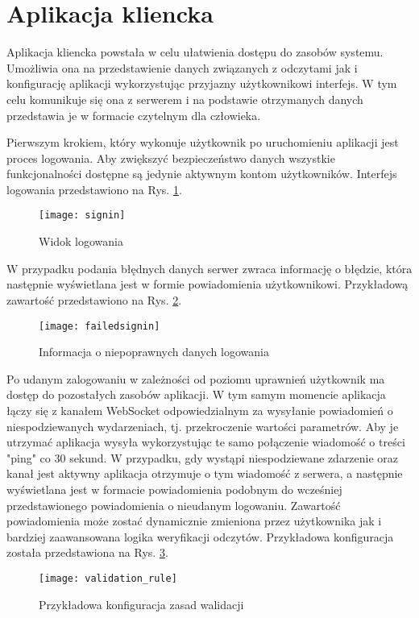 \section{Aplikacja kliencka}
Aplikacja kliencka powstała w celu ułatwienia dostępu do zasobów systemu.
Umożliwia ona na przedstawienie danych związanych z odczytami jak i konfigurację
aplikacji wykorzystując przyjazny użytkownikowi interfejs. W tym celu komunikuje
się ona z serwerem i na podstawie otrzymanych danych przedstawia je w formacie
czytelnym dla człowieka. 

Pierwszym krokiem, który wykonuje użytkownik po uruchomieniu aplikacji jest 
proces logowania. Aby zwiększyć bezpieczeństwo danych wszystkie funkcjonalności
dostępne są jedynie aktywnym kontom użytkowników.
Interfejs logowania przedstawiono na Rys. \ref{atmosphere:signin}.
\begin{figure}[h!]
  \centering
  \texttt{[image: signin]}
  \caption{Widok logowania}
  \label{atmosphere:signin}
\end{figure}
W przypadku podania błędnych danych serwer zwraca informację o błędzie, która następnie
wyświetlana jest w formie powiadomienia użytkownikowi. Przykładową zawartość przedstawiono
na Rys. \ref{atmosphere:failedsignin}.
\begin{figure}[h!]
  \centering
  \texttt{[image: failedsignin]}
  \caption{Informacja o niepoprawnych danych logowania}
  \label{atmosphere:failedsignin}
\end{figure}
Po udanym zalogowaniu w zależności od poziomu uprawnień użytkownik ma dostęp
do pozostałych zasobów aplikacji.
W tym samym momencie aplikacja łączy się z kanałem WebSocket odpowiedzialnym za
wysyłanie powiadomień o niespodziewanych wydarzeniach, tj. przekroczenie
wartości parametrów. Aby je utrzymać aplikacja wysyła wykorzystując te samo
połączenie wiadomość o treści "ping" co 30 sekund. W przypadku, gdy
wystąpi niespodziewane zdarzenie oraz kanał jest aktywny aplikacja otrzymuje
o tym wiadomość z serwera, a następnie wyświetlana jest w formacie powiadomienia
podobnym do wcześniej przedstawionego powiadomienia o nieudanym logowaniu.
Zawartość powiadomienia może zostać dynamicznie zmieniona przez użytkownika
jak i bardziej zaawansowana logika weryfikacji odczytów. Przykładowa konfiguracja
została przedstawiona na Rys. \ref{atmosphere:validation_rule}.
\begin{figure}[h!]
  \centering
  \texttt{[image: validation\_rule]}
  \caption{Przykładowa konfiguracja zasad walidacji}
  \label{atmosphere:validation_rule}
\end{figure}
